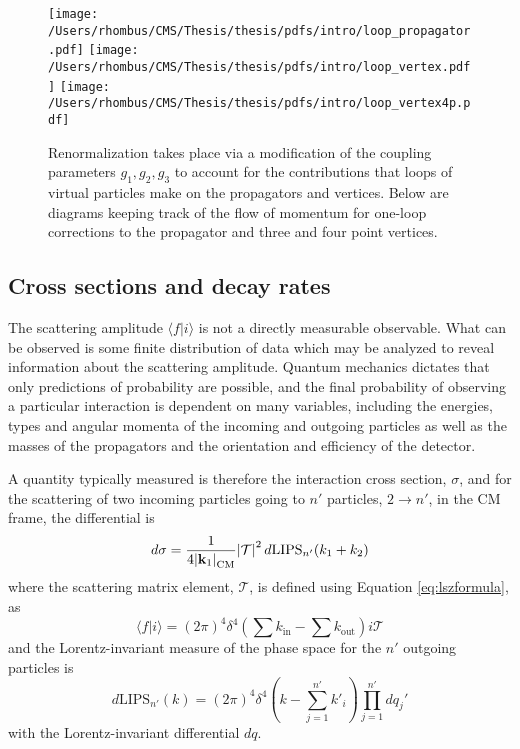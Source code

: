 \begin{figure}[!tb]
 \center
 \caption[One-loop corrections to vertices and propagator]{
  Renormalization takes place via a modification
   of the coupling parameters $g_1,g_2,g_3$ to account
   for the contributions that loops of virtual
   particles make on the propagators and vertices.
  Below are diagrams keeping track of the
   flow of momentum for one-loop corrections to the 
   propagator and three and four point vertices.
 } 
 \texttt{[image: /Users/rhombus/CMS/Thesis/thesis/pdfs/intro/loop\_propagator.pdf]}
 \texttt{[image: /Users/rhombus/CMS/Thesis/thesis/pdfs/intro/loop\_vertex.pdf]}
 \texttt{[image: /Users/rhombus/CMS/Thesis/thesis/pdfs/intro/loop\_vertex4p.pdf]}
    \label{fig:oneloopfeyn}
\end{figure}

\subsection{Cross sections and decay rates}

 The scattering amplitude $\langle f | i \rangle$
  is not a directly measurable observable.
 What can be observed is some finite distribution
  of data which may be analyzed to reveal
  information about the scattering amplitude.
 Quantum mechanics dictates that 
  only predictions of probability are possible,
  and the final probability of observing
  a particular interaction
  is dependent on many variables, including
  the energies, types and angular momenta of the incoming
  and outgoing particles as well as
  the masses of the propagators
  and the orientation and efficiency of the detector.

 A quantity typically measured is therefore the 
  interaction cross section, $\sigma$,
  and for the scattering of two incoming 
  particles going to $n'$ particles, $2\rightarrow n'$,
  in the CM frame, the differential is
\begin{equation}
 d\sigma = \frac{1}{4\abs{\mathbf{k}_1}_{\mathrm{CM}}}\abs{\mathcal{T}}^2 
  d\mathrm{LIPS}_{n'}(k_1 + k_2)
\end{equation}
  where the scattering matrix element, $\mathcal{T}$,
  is defined using Equation \ref{eq:lszformula}, as 
\begin{equation}\label{eq:matrixelement}
\langle f | i \rangle = (2\pi)^4\delta^4\left(\sum k_{\mathrm{in}}-\sum k_{\mathrm{out}}\right)
  i \mathcal{T}
\end{equation}
  and the Lorentz-invariant measure of the 
  phase space for the $n'$ outgoing particles is
\begin{equation}\label{eq:dlips}
 d\mathrm{LIPS}_{n'}(k) = (2\pi)^4 \delta^4
  \left(k - \sum_{j=1}^{n'}k'_i \right )
  \prod_{j=1}^{n'}dq_j'
\end{equation}
 with the Lorentz-invariant differential $dq$.

